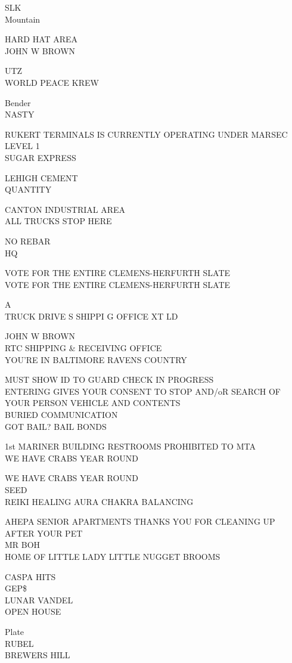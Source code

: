 \documentclass[10pt,letterpaper]{article}
\begin{document}
SLK\\
Mountain

HARD HAT AREA\\
JOHN W BROWN

UTZ\\
WORLD PEACE KREW

Bender\\
NASTY

RUKERT TERMINALS IS CURRENTLY OPERATING UNDER MARSEC LEVEL 1\\
SUGAR EXPRESS

LEHIGH CEMENT\\
QUANTITY

CANTON INDUSTRIAL AREA\\
ALL TRUCKS STOP HERE

NO REBAR\\
HQ

VOTE FOR THE ENTIRE CLEMENS{-}HERFURTH SLATE\\
VOTE FOR THE ENTIRE CLEMENS{-}HERFURTH SLATE

A\\
TRUCK DRIVE S SHIPPI G OFFICE XT LD

JOHN W BROWN\\
RTC SHIPPING \& RECEIVING OFFICE\\
YOU'RE IN BALTIMORE RAVENS COUNTRY

MUST SHOW ID TO GUARD CHECK IN PROGRESS\\
ENTERING GIVES YOUR CONSENT TO STOP AND/oR SEARCH OF YOUR PERSON VEHICLE AND CONTENTS\\
BURIED COMMUNICATION\\
GOT BAIL?  BAIL BONDS

1st MARINER BUILDING RESTROOMS PROHIBITED TO MTA\\
WE HAVE CRABS YEAR ROUND

WE HAVE CRABS YEAR ROUND\\
SEED\\
REIKI HEALING AURA CHAKRA BALANCING

AHEPA SENIOR APARTMENTS THANKS YOU FOR CLEANING UP AFTER YOUR PET\\
MR BOH\\
HOME OF LITTLE LADY LITTLE NUGGET BROOMS

CASPA HITS\\
GEP\$\\
LUNAR VANDEL\\
OPEN HOUSE

Plate\\
RUBEL\\
BREWERS HILL
\end{document}
